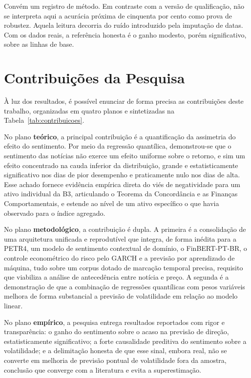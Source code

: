 Convém um registro de método. Em contraste com a versão de qualificação, não se interpreta aqui a acurácia próxima de cinquenta por cento como prova de robustez. Aquela leitura decorria do ruído introduzido pela imputação de datas. Com os dados reais, a referência honesta é o ganho modesto, porém significativo, sobre as linhas de base.

\section{Contribuições da Pesquisa}

À luz dos resultados, é possível enunciar de forma precisa as contribuições deste trabalho, organizadas em quatro planos e sintetizadas na Tabela~\ref{tab:contribuicoes}.

No plano \textbf{teórico}, a principal contribuição é a quantificação da assimetria do efeito do sentimento. Por meio da regressão quantílica, demonstrou-se que o sentimento das notícias não exerce um efeito uniforme sobre o retorno, e sim um efeito concentrado na cauda inferior da distribuição, grande e estatisticamente significativo nos dias de pior desempenho e praticamente nulo nos dias de alta. Esse achado fornece evidência empírica direta do viés de negatividade para um ativo individual da B3, articulando o Teorema da Concordância e as Finanças Comportamentais, e estende ao nível de um ativo específico o que  havia observado para o índice agregado.

No plano \textbf{metodológico}, a contribuição é dupla. A primeira é a consolidação de uma arquitetura unificada e reprodutível que integra, de forma inédita para a PETR4, um modelo de sentimento contextual de domínio, o FinBERT-PT-BR, o controle econométrico do risco pelo GARCH e a previsão por aprendizado de máquina, tudo sobre um corpus dotado de marcação temporal precisa, requisito que viabiliza a análise de antecedência entre notícia e preço. A segunda é a demonstração de que a combinação de regressões quantílicas com pesos variáveis melhora de forma substancial a previsão de volatilidade em relação ao modelo linear.

No plano \textbf{empírico}, a pesquisa entrega resultados reportados com rigor e transparência: o ganho do sentimento sobre o acaso na previsão de direção, estatisticamente significativo; a forte causalidade preditiva do sentimento sobre a volatilidade; e a delimitação honesta de que esse sinal, embora real, não se converte em melhoria de previsão pontual de volatilidade fora da amostra, conclusão que converge com a literatura e evita a superestimação.

